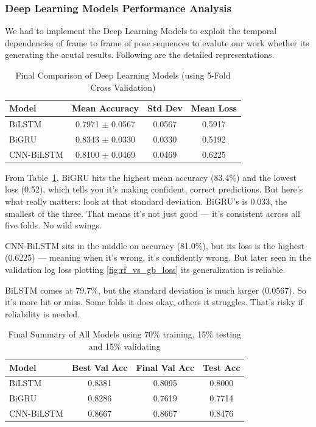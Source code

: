 \subsubsection{Deep Learning Models Performance Analysis}


We had to implement the Deep Learning Models to exploit the temporal dependencies of frame to frame of pose sequences to evalute our work whether its generating the acutal results. Following are the detailed representations.

\begin{table}[htbp]
\centering
\caption{Final Comparison of Deep Learning Models (using 5-Fold Cross Validation)}
\label{tab:dl_model_comparison_5_fold}
\begin{tabular}{l c c c}
\hline
\textbf{Model} & \textbf{Mean Accuracy} & \textbf{Std Dev} & \textbf{Mean Loss} \\
\hline
BiLSTM & 0.7971 $\pm$ 0.0567 & 0.0567 & 0.5917 \\
BiGRU & 0.8343 $\pm$ 0.0330 & 0.0330 & 0.5192 \\
CNN-BiLSTM & 0.8100 $\pm$ 0.0469 & 0.0469 & 0.6225 \\
\hline
\end{tabular}
\end{table}

From Table~\ref{tab:dl_model_comparison_5_fold}, BiGRU  hits the highest mean accuracy (83.4\%) and the lowest loss (0.52), which tells you it's making confident, correct predictions. But here's what really matters: look at that standard deviation. BiGRU's is 0.033, the smallest of the three. That means it's not just good — it's consistent across all five folds. No wild swings.

CNN-BiLSTM sits in the middle on accuracy (81.0\%), but its loss is the highest (0.6225) — meaning when it's wrong, it's confidently wrong. But later seen in the validation log loss plotting \ref{fig:rf_vs_gb_loss} its generalization is reliable.

BiLSTM comes at 79.7\%, but the standard deviation is much larger (0.0567). So it's more hit or miss. Some folds it does okay, others it struggles. That's risky if reliability is needed.



\begin{table}[htbp]
\centering
\caption{Final Summary of All Models using 70\% training, 15\% testing and 15\% validating}
\label{tab:final_summary_split}
\begin{tabular}{l c c c}
\hline
\textbf{Model} & \textbf{Best Val Acc} & \textbf{Final Val Acc} & \textbf{Test Acc} \\
\hline
BiLSTM & 0.8381 & 0.8095 & 0.8000 \\
BiGRU & 0.8286 & 0.7619 & 0.7714 \\
CNN-BiLSTM & 0.8667 & 0.8667 & 0.8476 \\
\hline
\end{tabular}
\end{table}

